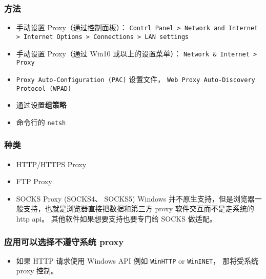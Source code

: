 
\subsubsection{方法}
\begin{itemize}
\item 手动设置 Proxy（通过控制面板）： \verb`Contrl Panel > Network and Internet > Internet Options > Connections > LAN settings`
\item 手动设置 Proxy（通过 Win10 或以上的设置菜单）： \verb`Network & Internet > Proxy`
\item \verb`Proxy Auto-Configuration (PAC)` 设置文件， \verb`Web Proxy Auto-Discovery Protocol (WPAD)`
\item 通过设置\textbf{组策略}
\item 命令行的 \verb`netsh`
\end{itemize}

\subsubsection{种类}
\begin{itemize}
\item HTTP/HTTPS Proxy
\item FTP Proxy
\item SOCKS Proxy (SOCKS4、 SOCKS5) Windows 并不原生支持，但是浏览器一般支持，也就是浏览器直接把数据和第三方 proxy 软件交互而不是走系统的 http api。 其他软件如果想要支持也要专门给 SOCKS 做适配。
\end{itemize}

\subsubsection{应用可以选择不遵守系统 proxy}
\begin{itemize}
\item 如果 HTTP 请求使用 Windows API 例如 \verb`WinHTTP` or \verb`WinINET`， 那将受系统 proxy 控制。
\end{itemize}
